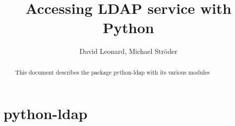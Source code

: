 \documentclass{manual}
\title{Accessing LDAP service with Python}
\author{David Leonard, Michael Str\"oder}
\begin{document}
\maketitle

\begin{abstract}
\noindent
This document describes the package python-ldap with its various modules
\end{abstract}

\tableofcontents

\chapter{ python-ldap }






\renewcommand{\indexname}{Index}
\end{document}
